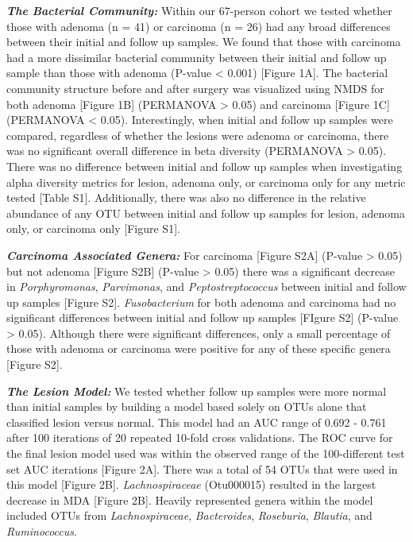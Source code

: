 \documentclass[12pt,]{article}
\begin{document}
\textbf{\emph{The Bacterial Community:}} Within our 67-person cohort we
tested whether those with adenoma (n = 41) or carcinoma (n = 26) had any
broad differences between their initial and follow up samples. We found
that those with carcinoma had a more dissimilar bacterial community
between their initial and follow up sample than those with adenoma
(P-value \textless{} 0.001) {[}Figure 1A{]}. The bacterial community
structure before and after surgery was visualized using NMDS for both
adenoma {[}Figure 1B{]} (PERMANOVA \textgreater{} 0.05) and carcinoma
{[}Figure 1C{]} (PERMANOVA \textless{} 0.05). Interestingly, when
initial and follow up samples were compared, regardless of whether the
lesions were adenoma or carcinoma, there was no significant overall
difference in beta diversity (PERMANOVA \textgreater{} 0.05). There was
no difference between initial and follow up samples when investigating
alpha diversity metrics for lesion, adenoma only, or carcinoma only for
any metric tested {[}Table S1{]}. Additionally, there was also no
difference in the relative abundance of any OTU between initial and
follow up samples for lesion, adenoma only, or carcinoma only {[}Figure
S1{]}.

\textbf{\emph{Carcinoma Associated Genera:}} For carcinoma {[}Figure
S2A{]} (P-value \textgreater{} 0.05) but not adenoma {[}Figure S2B{]}
(P-value \textgreater{} 0.05) there was a significant decrease in
\emph{Porphyromonas}, \emph{Parvimonas}, and \emph{Peptostreptococcus}
between initial and follow up samples {[}Figure S2{]}.
\emph{Fusobacterium} for both adenoma and carcinoma had no significant
differences between initial and follow up samples {[}FIgure S2{]}
(P-value \textgreater{} 0.05). Although there were significant
differences, only a small percentage of those with adenoma or carcinoma
were positive for any of these specific genera {[}Figure S2{]}.

\textbf{\emph{The Lesion Model:}} We tested whether follow up samples
were more normal than initial samples by building a model based solely
on OTUs alone that classified lesion versus normal. This model had an
AUC range of 0.692 - 0.761 after 100 iterations of 20 repeated 10-fold
cross validations. The ROC curve for the final lesion model used was
within the observed range of the 100-different test set AUC iterations
{[}Figure 2A{]}. There was a total of 54 OTUs that were used in this
model {[}Figure 2B{]}. \emph{Lachnospiraceae} (Otu000015) resulted in
the largest decrease in MDA {[}Figure 2B{]}. Heavily represented genera
within the model included OTUs from \emph{Lachnospiraceae},
\emph{Bacteroides}, \emph{Roseburia}, \emph{Blautia}, and
\emph{Ruminococcus}.
\end{document}
